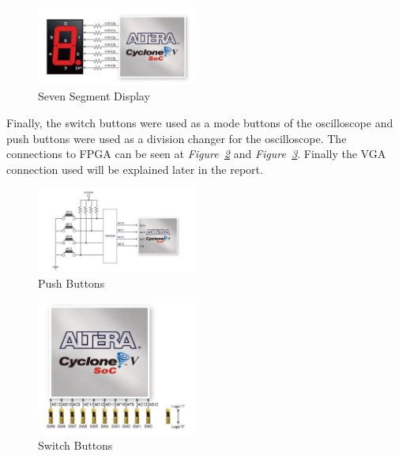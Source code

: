 \documentclass[paper]{IEEEtran}
\begin{document}
\begin{figure}[H]
	\setlength{\unitlength}{\textwidth}
	\center 
	\includegraphics[width=0.47\textwidth]{SSD}
	\caption{\label{fig:SSD} Seven Segment Display}
\end{figure}

	Finally, the switch buttons were used as a mode buttons of the oscilloscope and push buttons were used as a division changer for the oscilloscope. The connections to FPGA can be seen at \textit{Figure~\ref{fig:pushbuttons}} and \textit{Figure~\ref{fig:switchbuttons}}. Finally the VGA connection used will be explained later in the report. 

\begin{figure}[h!]
	\setlength{\unitlength}{\textwidth}
	\center 
	\includegraphics[width=0.47\textwidth]{pushbuttons}
	\caption{\label{fig:pushbuttons} Push Buttons}
\end{figure}


\begin{figure}[h!]
	\setlength{\unitlength}{\textwidth}
	\center 
	\includegraphics[width=0.47\textwidth]{switchbuttons}
	\caption{\label{fig:switchbuttons} Switch Buttons}
\end{figure}



\-\\[1cm]
\end{document}
